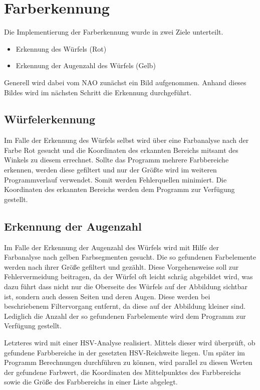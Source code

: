 \chapter{Farberkennung}

    Die Implementierung der Farberkennung wurde in zwei Ziele unterteilt.
    \begin{itemize}
        \item Erkennung des Würfels (Rot)
        \item Erkennung der Augenzahl des Würfels (Gelb)
    \end{itemize}
    Generell wird dabei vom NAO zunächst ein Bild aufgenommen.
    Anhand dieses Bildes wird im nächsten Schritt die Erkennung durchgeführt.

    \section{Würfelerkennung}

        Im Falle der Erkennung des Würfels selbst wird über eine Farbanalyse
        nach der Farbe Rot gesucht und die Koordinaten des erkannten Bereichs
        mitsamt des Winkels zu diesem errechnet.
        Sollte das Programm mehrere Farbbereiche erkennen, werden diese
        gefiltert und nur der Größte wird im weiteren Programmverlauf verwendet.
        Somit werden Fehlerquellen minimiert.
        Die Koordinaten des erkannten Bereichs werden dem Programm zur Verfügung
        gestellt.

    \section{Erkennung der Augenzahl}

        Im Falle der Erkennung der Augenzahl des Würfels wird mit Hilfe der
        Farbanalyse nach gelben Farbsegmenten gesucht.
        Die so gefundenen Farbelemente werden nach ihrer Größe gefiltert und
        gezählt.
        Diese Vorgehensweise soll zur Fehlervermeidung beitragen, da der Würfel
        oft leicht schräg abgebildet wird, was dazu führt dass nicht nur die
        Oberseite des Würfels auf der Abbildung sichtbar ist, sondern auch
        dessen Seiten und deren Augen.
        Diese werden bei beschriebenem Filtervorgang entfernt, da diese auf der
        Abbildung kleiner sind.
        Lediglich die Anzahl der so gefundenen Farbelemente wird dem Programm
        zur Verfügung gestellt.

        Letzteres wird mit einer \ac{HSV}-Analyse realisiert.
        Mittels dieser wird überprüft, ob gefundene Farbbereiche in der
        gesetzten \ac{HSV}-Reichweite liegen.
        Um später im Programm Berechnungen durchführen zu können, wird parallel
        zu diesen Werten der gefundene Farbwert, die Koordinaten des
        Mittelpunktes des Farbbereichs sowie die Größe des Farbbereichs in einer
        Liste abgelegt.

